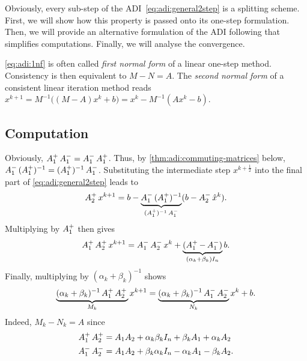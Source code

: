 Obviously, every sub-step of the \ac{ADI}~\eqref{eq:adi:general2step} is a splitting scheme.
First, we will show how this property is passed onto its one-step formulation.
Then, we will provide an alternative formulation of the ADI following \cite{Li2002} that simplifies computations.
Finally, we will analyse the convergence.

\begin{remark}
  \eqref{eq:adi:1nf} is often called \emph{first normal form} of a linear one-step method.
  Consistency is then equivalent to $M-N=A$.
  The \emph{second normal form} of a consistent linear iteration method reads
  $
    x^{k+1}
    = M^{-1} \big( (M-A) x^k + b \big)
    = x^k - M^{-1}(Ax^k - b)
  $.
\end{remark}

\subsection{Computation}

Obviously, $\mathop{A_1^+}\mathop{A_1^-} = \mathop{A_1^-}\mathop{A_1^+}$.
Thus, by \autoref{thm:adi:commuting-matrices} below, $\mathop{A_1^-}\mathop{(\mathop{A_1^+})^{-1}} = \mathop{(\mathop{A_1^+})^{-1}}\mathop{A_1^-}$.
Substituting the intermediate step $x^{k+\frac{1}{2}}$ into the final part of \eqref{eq:adi:general2step} leads to
\begin{equation*}
  \mathop{A_2^+} x^{k+1}
  = b - \underbrace{
    \mathop{A_1^-}\mathop{(\mathop{A_1^+})^{-1}}
  }_{\mathop{(\mathop{A_1^+})^{-1}}\mathop{A_1^-}}
  (b - \mathop{A_2^-} \hat x^k)
  .
\end{equation*}
Multiplying by $\mathop{A_1^+}$ then gives
\begin{equation*}
  \Aip\Aiip x^{k+1} = \Aim\Aiim x^k +
  \underbrace{%
  (\Aip - \Aim)
  }_{(\alpha_k + \beta_k) I_n}
  b
  .
\end{equation*}
Finally, multiplying by $(\alpha_k + \beta_k)^{-1}$ shows
\begin{equation}
\label{eq:adi:general1step}
  \underbrace{
    (\alpha_k + \beta_k)^{-1} \mathop{A_1^+}\mathop{A_2^+} \\
  }_{M_k}
  x^{k+1} =
  \underbrace{
    (\alpha_k + \beta_k)^{-1} \mathop{A_1^-}\mathop{A_2^-}
  }_{N_k}
  x^k + b
  .
\end{equation}
Indeed, $M_k - N_k = A$ since
\begin{align*}
  \mathop{A_1^+}\mathop{A_2^+} &= A_1A_2 + \alpha_k\beta_k I_n + \beta_k A_1 + \alpha_k A_2 \\
  \mathop{A_1^-}\mathop{A_2^-} &= A_1A_2 + \beta_k\alpha_k I_n - \alpha_k A_1 - \beta_k A_2
  .
\end{align*}

